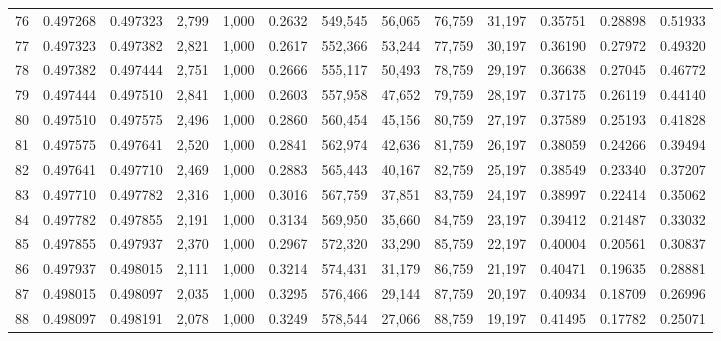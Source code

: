 \begin{tabular}{rrrrrrrrrrrrr}
76  &  0.497268 &  0.497323 &   2,799 &  1,000 &                                     0.2632 &  549,545 &   56,065 &   76,759 &   31,197 &  0.35751 &  0.28898 &  0.51933 \\
77  &  0.497323 &  0.497382 &   2,821 &  1,000 &                                     0.2617 &  552,366 &   53,244 &   77,759 &   30,197 &  0.36190 &  0.27972 &  0.49320 \\
78  &  0.497382 &  0.497444 &   2,751 &  1,000 &                                     0.2666 &  555,117 &   50,493 &   78,759 &   29,197 &  0.36638 &  0.27045 &  0.46772 \\
79  &  0.497444 &  0.497510 &   2,841 &  1,000 &                                     0.2603 &  557,958 &   47,652 &   79,759 &   28,197 &  0.37175 &  0.26119 &  0.44140 \\
80  &  0.497510 &  0.497575 &   2,496 &  1,000 &                                     0.2860 &  560,454 &   45,156 &   80,759 &   27,197 &  0.37589 &  0.25193 &  0.41828 \\
81  &  0.497575 &  0.497641 &   2,520 &  1,000 &                                     0.2841 &  562,974 &   42,636 &   81,759 &   26,197 &  0.38059 &  0.24266 &  0.39494 \\
82  &  0.497641 &  0.497710 &   2,469 &  1,000 &                                     0.2883 &  565,443 &   40,167 &   82,759 &   25,197 &  0.38549 &  0.23340 &  0.37207 \\
83  &  0.497710 &  0.497782 &   2,316 &  1,000 &                                     0.3016 &  567,759 &   37,851 &   83,759 &   24,197 &  0.38997 &  0.22414 &  0.35062 \\
84  &  0.497782 &  0.497855 &   2,191 &  1,000 &                                     0.3134 &  569,950 &   35,660 &   84,759 &   23,197 &  0.39412 &  0.21487 &  0.33032 \\
85  &  0.497855 &  0.497937 &   2,370 &  1,000 &                                     0.2967 &  572,320 &   33,290 &   85,759 &   22,197 &  0.40004 &  0.20561 &  0.30837 \\
86  &  0.497937 &  0.498015 &   2,111 &  1,000 &                                     0.3214 &  574,431 &   31,179 &   86,759 &   21,197 &  0.40471 &  0.19635 &  0.28881 \\
87  &  0.498015 &  0.498097 &   2,035 &  1,000 &                                     0.3295 &  576,466 &   29,144 &   87,759 &   20,197 &  0.40934 &  0.18709 &  0.26996 \\
88  &  0.498097 &  0.498191 &   2,078 &  1,000 &                                     0.3249 &  578,544 &   27,066 &   88,759 &   19,197 &  0.41495 &  0.17782 &  0.25071 \\

\end{tabular}
